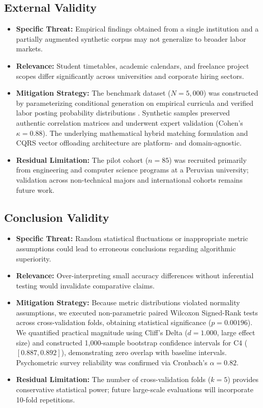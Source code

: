 \documentclass[a4paper,fleqn]{cas-dc}
\begin{document}
\subsection{External Validity}
\begin{itemize}
    \item \textbf{Specific Threat:} Empirical findings obtained from a single institution and a partially augmented synthetic corpus may not generalize to broader labor markets.
    \item \textbf{Relevance:} Student timetables, academic calendars, and freelance project scopes differ significantly across universities and corporate hiring sectors.
    \item \textbf{Mitigation Strategy:} The benchmark dataset ($N = 5,000$) was constructed by parameterizing conditional generation on empirical curricula and verified labor posting probability distributions \cite{rebaza2025, huaman2024}. Synthetic samples preserved authentic correlation matrices and underwent expert validation (Cohen's $\kappa = 0.88$). The underlying mathematical hybrid matching formulation and CQRS vector offloading architecture are platform- and domain-agnostic.
    \item \textbf{Residual Limitation:} The pilot cohort ($n = 85$) was recruited primarily from engineering and computer science programs at a Peruvian university; validation across non-technical majors and international cohorts remains future work.
\end{itemize}

\subsection{Conclusion Validity}
\begin{itemize}
    \item \textbf{Specific Threat:} Random statistical fluctuations or inappropriate metric assumptions could lead to erroneous conclusions regarding algorithmic superiority.
    \item \textbf{Relevance:} Over-interpreting small accuracy differences without inferential testing would invalidate comparative claims.
    \item \textbf{Mitigation Strategy:} Because metric distributions violated normality assumptions, we executed non-parametric paired Wilcoxon Signed-Rank tests across cross-validation folds, obtaining statistical significance ($p = 0.00196$). We quantified practical magnitude using Cliff's Delta ($d = 1.000$, large effect size) and constructed 1,000-sample bootstrap confidence intervals for C4 ($[0.887, 0.892]$), demonstrating zero overlap with baseline intervals. Psychometric survey reliability was confirmed via Cronbach's $\alpha = 0.82$.
    \item \textbf{Residual Limitation:} The number of cross-validation folds ($k = 5$) provides conservative statistical power; future large-scale evaluations will incorporate 10-fold repetitions.
\end{itemize}
\end{document}
